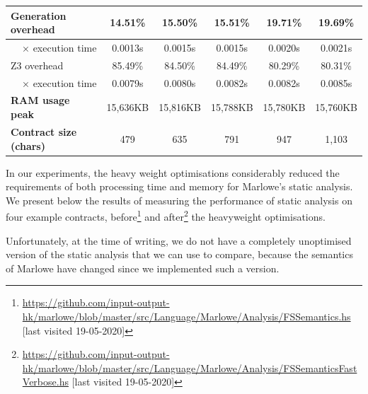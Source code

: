 \documentclass[english,runningheads]{llncs}
\begin{document}
\begin{table}[]
{\begin{tabular}{l||lllll}
Generation overhead                    & \multicolumn{1}{c|}{14.51\%}  & \multicolumn{1}{c|}{15.50\%}  & \multicolumn{1}{c|}{15.51\%}  & \multicolumn{1}{c|}{19.71\%}  & \multicolumn{1}{c}{19.69\%} \\ \hline
\multicolumn{1}{r||}{× execution time} & \multicolumn{1}{c|}{0.0013s}  & \multicolumn{1}{c|}{0.0015s}  & \multicolumn{1}{c|}{0.0015s}  & \multicolumn{1}{c|}{0.0020s}  & \multicolumn{1}{c}{0.0021s} \\ \hline
Z3 overhead                            & \multicolumn{1}{c|}{85.49\%}  & \multicolumn{1}{c|}{84.50\%}  & \multicolumn{1}{c|}{84.49\%}  & \multicolumn{1}{c|}{80.29\%}  & \multicolumn{1}{c}{80.31\%} \\ \hline
\multicolumn{1}{r||}{× execution time} & \multicolumn{1}{c|}{0.0079s}  & \multicolumn{1}{c|}{0.0080s}  & \multicolumn{1}{c|}{0.0082s}  & \multicolumn{1}{c|}{0.0082s}  & \multicolumn{1}{c}{0.0085s} \\ \hline
\textbf{RAM usage peak}                & \multicolumn{1}{c|}{15,636KB} & \multicolumn{1}{c|}{15,816KB} & \multicolumn{1}{c|}{15,788KB} & \multicolumn{1}{c|}{15,780KB} & \multicolumn{1}{c}{15,760KB} \\ \hline \hline
\textbf{Contract size (chars)}         & \multicolumn{1}{c|}{479}      & \multicolumn{1}{c|}{635}      & \multicolumn{1}{c|}{791}      & \multicolumn{1}{c|}{947}      & \multicolumn{1}{c}{1,103}
\end{tabular}
}
\vspace*{-0.6cm}
\end{table}

In our experiments, the heavy weight optimisations considerably reduced
the requirements of both processing time and memory for Marlowe's static
analysis. %
We present below the results of measuring the performance of static analysis on
four example  contracts,
before\footnote{\url{https://github.com/input-output-hk/marlowe/blob/master/src/Language/Marlowe/Analysis/FSSemantics.hs} [last visited 19-05-2020]}
and after\footnote{\url{https://github.com/input-output-hk/marlowe/blob/master/src/Language/Marlowe/Analysis/FSSemanticsFastVerbose.hs} [last visited 19-05-2020]}
the heavyweight optimisations.

\noindent
Unfortunately, at the time of writing, we do not have a completely unoptimised
version of the static analysis that we can use to compare, because the semantics
of Marlowe have changed since we implemented such a version.
\end{document}
